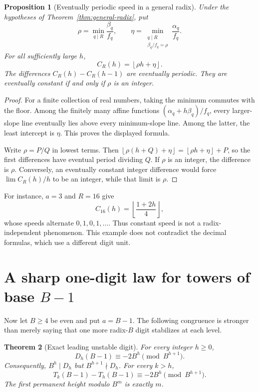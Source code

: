 \documentclass[11pt,letterpaper]{article}
\numberwithin{equation}{section}
\newtheorem{theorem}{Theorem}[section]
\newtheorem{proposition}[theorem]{Proposition}
\theoremstyle{definition}
\theoremstyle{remark}
\newcommand{\floor}[1]{\left\lfloor #1\right\rfloor}
\begin{document}
\begin{proposition}[Eventually periodic speed in a general radix]\label{prop:periodic}
Under the hypotheses of Theorem~\ref{thm:general-radix}, put
\[
 \rho=\min_{q\mid R}\frac{\beta_q}{f_q},\qquad
 \eta=\min_{\substack{q\mid R\\ \beta_q/f_q=\rho}}
             \frac{\alpha_q}{f_q}.
\]
For all sufficiently large $h$,
\[
 C_R(h)=\floor{\rho h+\eta}.
\]
The differences $C_R(h)-C_R(h-1)$ are eventually periodic. They are eventually constant if and only if $\rho$ is an integer.
\end{proposition}
\begin{proof}
For a finite collection of real numbers, taking the minimum commutes with the floor. Among the finitely many affine functions
$(\alpha_q+h\beta_q)/f_q$, every larger-slope line eventually lies above every minimum-slope line. Among the latter, the least intercept is $\eta$. This proves the displayed formula.

Write $\rho=P/Q$ in lowest terms. Then
$\floor{\rho(h+Q)+\eta}=\floor{\rho h+\eta}+P$, so the first differences have eventual period dividing $Q$. If $\rho$ is an integer, the difference is $\rho$. Conversely, an eventually constant integer difference would force $\lim C_R(h)/h$ to be an integer, while that limit is $\rho$.
\end{proof}

For instance, $a=3$ and $R=16$ give
\[
 C_{16}(h)=\floor{\frac{1+2h}{4}},
\]
whose speeds alternate $0,1,0,1,\ldots$. Thus constant speed is not a radix-independent phenomenon. This example does not contradict the decimal formulas, which use a different digit unit.

\section{A sharp one-digit law for towers of base \texorpdfstring{$B-1$}{B-1}}\label{sec:sharp}

Now let $B\ge4$ be even and put $a=B-1$. The following congruence is stronger than merely saying that one more radix-$B$ digit stabilizes at each level.

\begin{theorem}[Exact leading unstable digit]\label{thm:sharp}
For every integer $h\ge0$,
\begin{equation}\label{eq:sharp}
 \boxed{\ D_h(B-1)\equiv-2B^h\pmod{B^{h+1}}.\ }
\end{equation}
Consequently, $B^h\mid D_h$ but $B^{h+1}\nmid D_h$. For every $k>h$,
\begin{equation}\label{eq:sharp-telescope}
 T_k(B-1)-T_h(B-1)\equiv-2B^h\pmod{B^{h+1}}.
\end{equation}
The first permanent height modulo $B^m$ is exactly $m$.
\end{theorem}
\end{document}
